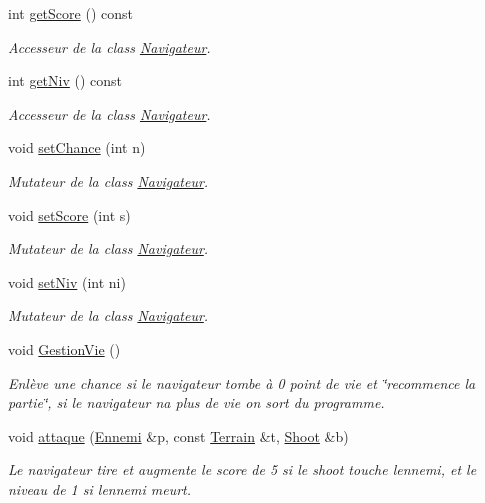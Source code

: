 \begin{DoxyCompactItemize}
int \hyperlink{class_navigateur_a52606df1f11308074aa64a81cc25e467}{get\+Score} () const
\begin{DoxyCompactList}\small\item\em Accesseur de la class \hyperlink{class_navigateur}{Navigateur}. \end{DoxyCompactList}\item 
int \hyperlink{class_navigateur_a904f67b146dbb561d72cc38ead3d7318}{get\+Niv} () const
\begin{DoxyCompactList}\small\item\em Accesseur de la class \hyperlink{class_navigateur}{Navigateur}. \end{DoxyCompactList}\item 
void \hyperlink{class_navigateur_a4b626cdf47683b637b1e9e000fae467b}{set\+Chance} (int n)
\begin{DoxyCompactList}\small\item\em Mutateur de la class \hyperlink{class_navigateur}{Navigateur}. \end{DoxyCompactList}\item 
void \hyperlink{class_navigateur_a85b21f5d57ed9e03e3276c369eb00fd7}{set\+Score} (int s)
\begin{DoxyCompactList}\small\item\em Mutateur de la class \hyperlink{class_navigateur}{Navigateur}. \end{DoxyCompactList}\item 
void \hyperlink{class_navigateur_af5d5be24410820dfebd15fb5b0966920}{set\+Niv} (int ni)
\begin{DoxyCompactList}\small\item\em Mutateur de la class \hyperlink{class_navigateur}{Navigateur}. \end{DoxyCompactList}\item 
void \hyperlink{class_navigateur_acfd9f284039fa874e7dc146c5cbc9867}{Gestion\+Vie} ()
\begin{DoxyCompactList}\small\item\em Enlève une chance si le navigateur tombe à 0 point de vie et \char`\"{}recommence la partie\char`\"{}, si le navigateur n\textquotesingle{}a plus de vie on sort du programme. \end{DoxyCompactList}\item 
void \hyperlink{class_navigateur_a975f7dc7ac781d977090c75050a1920c}{attaque} (\hyperlink{class_ennemi}{Ennemi} \&p, const \hyperlink{class_terrain}{Terrain} \&t, \hyperlink{class_shoot}{Shoot} \&b)
\begin{DoxyCompactList}\small\item\em Le navigateur tire et augmente le score de 5 si le shoot touche l\textquotesingle{}ennemi, et le niveau de 1 si l\textquotesingle{}ennemi meurt. \end{DoxyCompactList}\item 

\end{DoxyCompactItemize}
